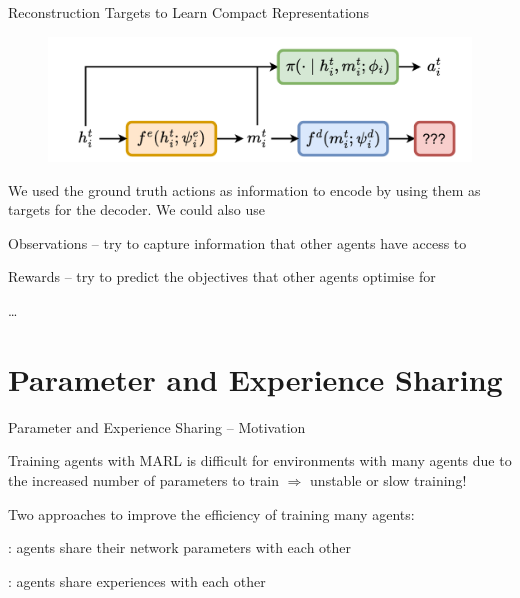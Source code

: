 \begin{frame}[t]{Reconstruction Targets to Learn Compact Representations}
    \begin{figure}
        \centering
        \includegraphics[width=.65\textwidth]{images/agent_modelling_encoder_decoder_targets.pdf}
    \end{figure}

    \vspace{-2em}

    \begin{notebox}
        We used the ground truth actions as information to encode by using them as targets for the decoder. We could also use
        \blist
            \item Observations -- try to capture information that other agents have access to
            \item Rewards -- try to predict the objectives that other agents optimise for
            \item \ldots
        \elist
    \end{notebox}
\end{frame}

\section{Parameter and Experience Sharing}

\begin{frame}[t]{Parameter and Experience Sharing -- Motivation}
    \begin{problembox}
        Training agents with MARL is difficult for environments with many agents due to the increased number of parameters to train $\Rightarrow$ unstable or slow training!
    \end{problembox}

    \pause

    \begin{solutionbox}
        Two approaches to improve the efficiency of training many agents:
        \blist
            \item {}: agents share their network parameters with each other
            \item {}: agents share experiences with each other
        \elist
    \end{solutionbox}
\end{frame}

